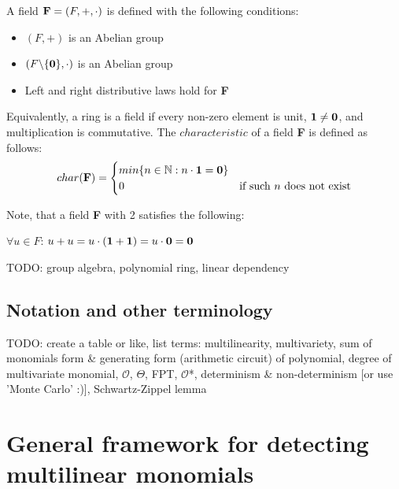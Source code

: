 A field $\textbf F = (F, +, \cdot)$ is defined with the following conditions:
\begin{itemize}
  \item $(F, +)$ is an Abelian group
  \item $(F\backslash \{\textbf 0\}, \cdot )$ is an Abelian group
  \item Left and right distributive laws hold for \textbf F
\end{itemize}

Equivalently, a ring is a field if every non-zero element is unit, $\textbf 1 \neq \textbf 0$, and multiplication is commutative. 
The $characteristic$ of a field \textbf F is defined as follows:
  \begin{equation}
    char(\textbf F) =
      \begin{cases}
        min\{n \in \mathbb N : n \cdot \textbf 1 = \textbf 0 \}\\
        0 & \text{if such $n$ does not exist}\\
      \end{cases}       
  \end{equation}

Note, that a field \textbf F with
 2 satisfies the following:
\begin{center}
  $\forall u \in F$: $u + u = u \cdot (\textbf 1 + \textbf 1) = u \cdot \textbf 0 = \textbf 0$
\end{center}

TODO: group algebra, polynomial ring, linear dependency

\subsection{Notation and other terminology} %

TODO: create a table or like, list terms: 
multilinearity, multivariety, sum of monomials form \& generating form (arithmetic circuit) of polynomial, 
degree of multivariate monomial, $\mathcal{O}$, $\Theta$, FPT, $\mathcal{O}$*, determinism \& non-determinism [or use 'Monte Carlo' :)], 
Schwartz-Zippel lemma


\section{General framework for detecting multilinear monomials}

